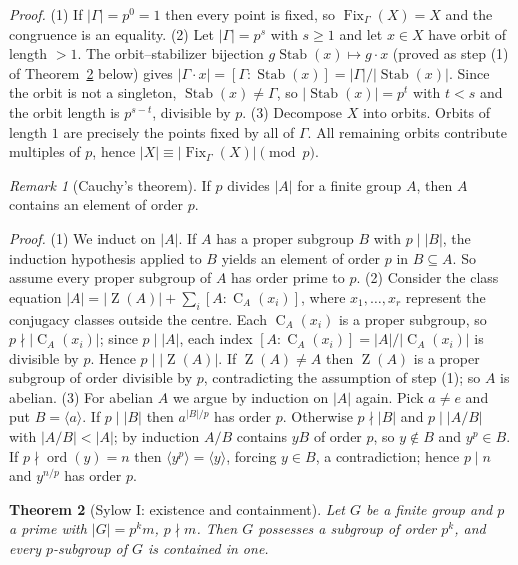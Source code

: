 \documentclass[11pt]{article}
\newtheorem{theorem}{Theorem}[section]
\theoremstyle{definition}
\theoremstyle{remark}
\newtheorem{remark}[theorem]{Remark}
\newcommand{\Fix}{\operatorname{Fix}}
\newcommand{\Stab}{\operatorname{Stab}}
\newcommand{\Cent}{\operatorname{C}}
\newcommand{\Z}{\operatorname{Z}}
\begin{document}
\emph{Proof.} (1) If $|\Gamma|=p^{0}=1$ then every point is fixed, so $\Fix_\Gamma(X)=X$ and the congruence is an equality.
(2) Let $|\Gamma|=p^{s}$ with $s\ge 1$ and let $x\in X$ have orbit of length $>1$. The orbit--stabilizer bijection $g\Stab(x)\mapsto g\cdot x$ (proved as step (1) of Theorem~\ref{thm:sylow1} below) gives $|\Gamma\cdot x|=[\Gamma:\Stab(x)]=|\Gamma|/|\Stab(x)|$. Since the orbit is not a singleton, $\Stab(x)\ne\Gamma$, so $|\Stab(x)|=p^{t}$ with $t<s$ and the orbit length is $p^{s-t}$, divisible by $p$.
(3) Decompose $X$ into orbits. Orbits of length $1$ are precisely the points fixed by all of $\Gamma$. All remaining orbits contribute multiples of $p$, hence $|X|\equiv |\Fix_\Gamma(X)|\pmod p$.
\begin{remark}[Cauchy's theorem]\label{lem:cauchy}
If $p$ divides $|A|$ for a finite group $A$, then $A$ contains an element of order $p$.
\end{remark}

\emph{Proof.} (1) We induct on $|A|$. If $A$ has a proper subgroup $B$ with $p\mid |B|$, the induction hypothesis applied to $B$ yields an element of order $p$ in $B\subseteq A$. So assume every proper subgroup of $A$ has order prime to $p$.
(2) Consider the class equation $|A|=|\Z(A)|+\sum_{i}[A:\Cent_A(x_i)]$, where $x_1,\dots,x_r$ represent the conjugacy classes outside the centre. Each $\Cent_A(x_i)$ is a proper subgroup, so $p\nmid |\Cent_A(x_i)|$; since $p\mid |A|$, each index $[A:\Cent_A(x_i)]=|A|/|\Cent_A(x_i)|$ is divisible by $p$. Hence $p\mid |\Z(A)|$. If $\Z(A)\ne A$ then $\Z(A)$ is a proper subgroup of order divisible by $p$, contradicting the assumption of step (1); so $A$ is abelian.
(3) For abelian $A$ we argue by induction on $|A|$ again. Pick $a\ne e$ and put $B=\langle a\rangle$. If $p\mid |B|$ then $a^{|B|/p}$ has order $p$. Otherwise $p\nmid |B|$ and $p\mid |A/B|$ with $|A/B|<|A|$; by induction $A/B$ contains $yB$ of order $p$, so $y\notin B$ and $y^{p}\in B$. If $p\nmid \operatorname{ord}(y)=n$ then $\langle y^{p}\rangle=\langle y\rangle$, forcing $y\in B$, a contradiction; hence $p\mid n$ and $y^{n/p}$ has order $p$.

\begin{theorem}[Sylow I: existence and containment]\label{thm:sylow1}
Let $G$ be a finite group and $p$ a prime with $|G|=p^{k}m$, $p\nmid m$. Then $G$ possesses a subgroup of order $p^{k}$, and every $p$-subgroup of $G$ is contained in one.
\end{theorem}
\end{document}
